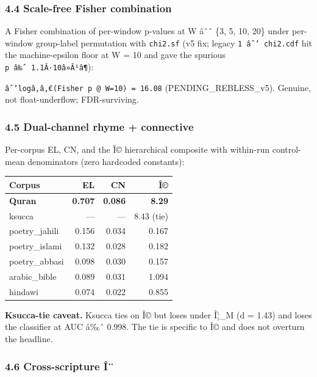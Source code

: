 \documentclass[
]{article}
\newcounter{none} %
\begin{document}
\subsubsection{4.4 Scale-free Fisher
combination}\label{scale-free-fisher-combination}

A Fisher combination of per-window p-values at W âˆˆ \{3, 5, 10, 20\}
under per-window group-label permutation with \texttt{chi2.sf} (v5 fix;
legacy \texttt{1\ âˆ’\ chi2.cdf} hit the machine-epsilon floor at W = 10
and gave the spurious \texttt{p\ â‰ˆ\ 1.1Â·10â»Â¹â¶}):

\texttt{âˆ’logâ‚â‚€(Fisher\ p\ @\ W=10)\ =\ 16.08}
(PENDING\_REBLESS\_v5). Genuine, not float-underflow; FDR-surviving.

\subsubsection{4.5 Dual-channel rhyme +
connective}\label{dual-channel-rhyme-connective}

Per-corpus EL, CN, and the Î© hierarchical composite with within-run
control-mean denominators (zero hardcoded constants):

{\def\LTcaptype{none} %
\begin{longtable}[]{@{}lrrr@{}}
\toprule\noalign{}
Corpus & EL & CN & Î© \\
\midrule\noalign{}
\endhead
\bottomrule\noalign{}
\endlastfoot
\textbf{Quran} & \textbf{0.707} & \textbf{0.086} & \textbf{8.29} \\
ksucca & --- & --- & 8.43 (tie) \\
poetry\_jahili & 0.156 & 0.034 & 0.167 \\
poetry\_islami & 0.132 & 0.028 & 0.182 \\
poetry\_abbasi & 0.098 & 0.030 & 0.157 \\
arabic\_bible & 0.089 & 0.031 & 1.094 \\
hindawi & 0.074 & 0.022 & 0.855 \\
\end{longtable}
}

\textbf{Ksucca-tie caveat.} Ksucca ties on Î© but loses under Î¦\_M (d =
1.43) and loses the classifier at AUC â‰ˆ 0.998. The tie is specific to
Î© and does not overturn the headline.

\subsubsection{4.6 Cross-scripture Î¨}\label{cross-scripture-uxee}
\end{document}
